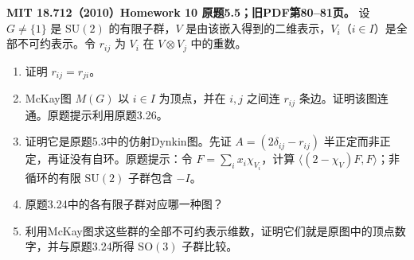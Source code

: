 \begin{exercise}\label{hw:5.5}
\textbf{MIT 18.712（2010）Homework 10 原题5.5；旧PDF第80--81页。}
设 $G\ne\{1\}$ 是 $\mathrm{SU}(2)$ 的有限子群，$V$ 是由该嵌入得到的二维表示，$V_i$（$i\in I$）是全部不可约表示。令 $r_{ij}$ 为 $V_i$ 在 $V\otimes V_j$ 中的重数。
\begin{enumerate}[label=(\alph*)]
\item 证明 $r_{ij}=r_{ji}$。
\item McKay图 $M(G)$ 以 $i\in I$ 为顶点，并在 $i,j$ 之间连 $r_{ij}$ 条边。证明该图连通。原题提示利用原题3.26。
\item 证明它是原题5.3中的仿射Dynkin图。先证 $A=(2\delta_{ij}-r_{ij})$ 半正定而非正定，再证没有自环。原题提示：令 $F=\sum_i x_i\chi_{V_i}$，计算 $\langle(2-\chi_V)F,F\rangle$；非循环的有限 $\mathrm{SU}(2)$ 子群包含 $-I$。
\item 原题3.24中的各有限子群对应哪一种图？
\item 利用McKay图求这些群的全部不可约表示维数，证明它们就是原图中的顶点数字，并与原题3.24所得 $\mathrm{SO}(3)$ 子群比较。
\end{enumerate}
\end{exercise}
